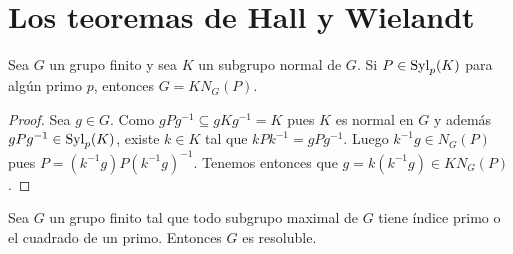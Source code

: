 \chapter{Los teoremas de Hall y Wielandt}

\begin{lemma}
	\label{lemma:Frattini_argument}
	Sea $G$ un grupo finito y sea $K$ un subgrupo normal de $G$. Si
	$P\in\mathrm{Syl}_p(K)$ para algún primo $p$, entonces $G=KN_G(P)$.
\end{lemma}

\begin{proof}
	Sea $g\in G$. Como $gPg^{-1}\subseteq gKg^{-1}=K$ pues $K$ es normal en $G$
	y además $gPg^{-1}\in\mathrm{Syl}_p(K)$, existe $k\in K$ tal que
	$kPk^{-1}=gPg^{-1}$. Luego $k^{-1}g\in N_G(P)$ pues
	$P=(k^{-1}g)P(k^{-1}g)^{-1}$. Tenemos entonces que $g=k(k^{-1}g)\in
	KN_G(P)$.
\end{proof}

\begin{theorem}[Hall]
	\label{theorem:Hall}
	Sea $G$ un grupo finito tal que todo subgrupo maximal de $G$ tiene índice
	primo o el cuadrado de un primo. Entonces $G$ es resoluble.
\end{theorem}

